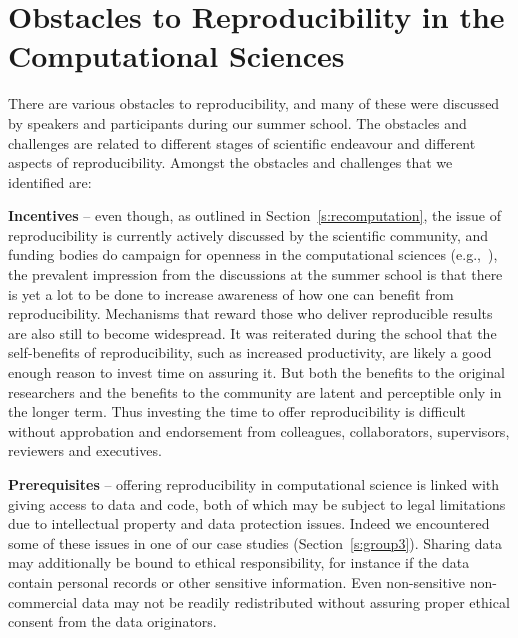 \section{Obstacles to Reproducibility in the Computational Sciences}
\label{s:obstacles}

There are various obstacles to reproducibility, and many of these were
  discussed by speakers and participants during our summer school.
The obstacles and challenges are related to different stages of scientific 
  endeavour and different aspects of reproducibility.
Amongst the obstacles and challenges that we identified are:

{\bf Incentives} -- even though, as outlined in Section~\ref{s:recomputation}, 
  the issue of reproducibility is
  currently actively discussed by the scientific community, 
  and funding bodies do campaign for
  openness in the computational sciences (e.g.,~\cite{NSF}), 
  the prevalent impression from the discussions at 
  the summer school is that there is yet a lot to be done to increase 
  awareness of how one can benefit from reproducibility.
Mechanisms that reward those who deliver reproducible results are also
  still to become widespread.
It was reiterated during the school that the self-benefits 
  of reproducibility, such as increased productivity, are likely 
  a good enough reason to invest time on assuring it.
But both the benefits to the original researchers and the benefits to the community
  are latent and perceptible only in the longer term.
Thus investing the time to offer reproducibility is difficult without
  approbation and endorsement from colleagues, collaborators, supervisors,
  reviewers and executives.
  
{\bf Prerequisites} -- offering reproducibility in computational
  science is linked with giving access to data and code, both of which may
  be subject to legal limitations due to intellectual property and
  data protection issues. Indeed we encountered some of these issues
  in one of our case studies (Section~\ref{s:group3}).
Sharing data may additionally be bound to ethical responsibility, for instance
  if the data contain personal records or other sensitive information. 
Even non-sensitive non-commercial data may not be readily redistributed
  without assuring proper ethical consent from the data originators.

